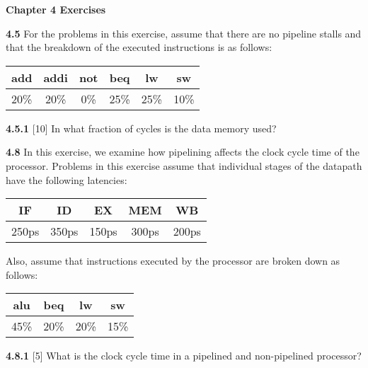 \documentclass[fleqn]{article}
\begin{document}
\pagestyle{fancy}
\fancyhead{}
\fancyhead[R]{\thepage}
\fancyfoot{}

\begin{center}
    \Large{\textbf{Chapter 4 Exercises}}\\
\end{center}
\vspace{0.25in}

\textbf{4.5} For the problems in this exercise, assume that there are no pipeline stalls and that the breakdown of the
executed instructions is as follows:

\begin{table}[H]
    \centering
    \begin{tabular}{|c|c|c|c|c|c|}
    \hline
    \rowcolor[HTML]{1391DB} 
    add & addi & not & beq & lw & sw \\ \hline
    20\% & 20\% & 0\% & 25\% & 25\% & 10\% \\ \hline
    \end{tabular}
\end{table}

\textbf{4.5.1} [10] \textrangle \; In what fraction of cycles is the data memory used?
\vspace{0.125in}

\textbf{4.8} In this exercise, we examine how pipelining affects the clock cycle time of the processor. Problems in
this exercise assume that individual stages of the datapath have the following latencies:

\begin{table}[H]
    \centering
    \begin{tabular}{|c|c|c|c|c|}
    \hline
    \rowcolor[HTML]{1391DB} 
    IF & ID & EX & MEM & WB \\ \hline
    250ps & 350ps & 150ps & 300ps & 200ps \\ \hline
    \end{tabular}
\end{table}

Also, assume that instructions executed by the processor are broken down as follows:
\begin{table}[H]
    \centering
    \begin{tabular}{|c|c|c|c|}
    \hline
    \rowcolor[HTML]{1391DB} 
    alu & beq & lw & sw  \\ \hline
    45\% & 20\% & 20\% & 15\% \\ \hline
    \end{tabular}
\end{table}
\textbf{4.8.1} [5] \textrangle \; What is the clock cycle time in a pipelined and non-pipelined processor?
\end{document}
